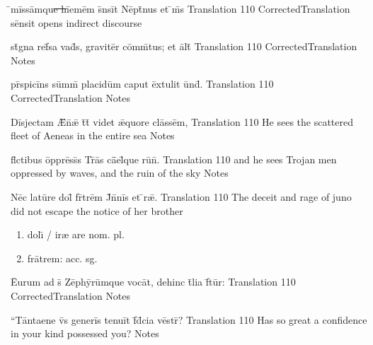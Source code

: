 \latline
  {\={}m\=iss\=amqu\sout{e h}\={ie}m\=em s\={}ns\=it N\=ept\={}n\-us \-et \={\macron {\i}}m\={\macron {\i}}s}
  { Translation }
  {110}
  { CorrectedTranslation }
  { s\={e}nsit opens indirect discourse }


\latline
  {st\={}gn\-a r\-ef\={}s\-a v\-ad\={\macron {\i}}s, gr\-av\-it\=er c\=omm\={}t\-us; \-et \=alt\={}}
  { Translation }
  {110}
  { CorrectedTranslation }
  { Notes }





\latline
  {pr\={}sp\-ic\-i\={}ns s\=umm\={} pl\-ac\-id\=um c\-ap\-ut \=ext\-ul\-it \=und\={}.}
  { Translation }
  {110}
  { CorrectedTranslation }
  { Notes }


\latline
  {D\=isj\-ect\-am \={\AE}n\={}\={\ae} t\={}t\={} v\-id\-et \={\ae}qu\-or\-e cl\=ass\=em,}
  { Translation }
  {110}
  { He sees the scattered fleet of Aeneas in the entire sea }
  { Notes }


\latline
  {fl\={}ct\-ib\-us \=oppr\=ess\={}s Tr\={}\=as c\={\=ae}l\={\macron {\i}}qu\-e r\-u\={\macron {\i}}n\={}.}
  { Translation }
  {110}
  { and he sees Trojan men oppressed by waves, and the ruin of the sky }
  { Notes }





\latline
  {N\=ec l\-at\-u\={}r\-e d\-ol\={\macron {\i}} fr\={}tr\=em J\={}n\={}n\=is \-et \={\macron {\i}}r\={\ae}.}
  { Translation }
  {110}
  { The deceit and rage of juno did not escape the notice of her brother }
  { \begin{enumerate}
  	\item dol\={\i} / ir{\ae} are nom. pl.
  	\item fr\={a}trem:  acc. sg.
  \end{enumerate} }


\latline
  {\={Eu}r\-um \-ad s\={} Z\=eph\=yr\=umqu\-e v\-oc\=at, d\-eh\-inc t\={}l\-i\-a f\={}t\=ur:}
  { Translation }
  {110}
  { CorrectedTranslation }
  { Notes }


\latline
  {``T\=ant\-aen\-e v\={}s g\-en\-er\=is t\-en\-u\=it f\={\macron {\i}}d\={}c\-i\-a v\=estr\={\macron {\i}}?}
  { Translation }
  {110}
  { Has so great a confidence in your kind possessed you? }
  { Notes }





